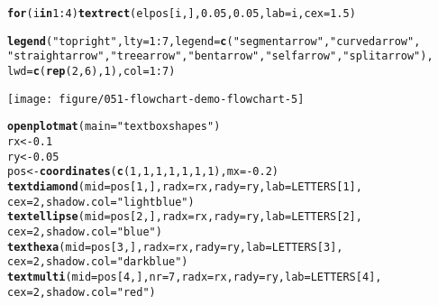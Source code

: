 \documentclass{article}\usepackage[]{graphicx}\usepackage[]{xcolor}
\makeatletter
\def\maxwidth{ %
  \ifdim\Gin@nat@width>\linewidth
    \linewidth
  \else
    \Gin@nat@width
  \fi
}
\newcommand{\hlnum}[1]{\textcolor[rgb]{0.686,0.059,0.569}{#1}}%
\newcommand{\hlsng}[1]{\textcolor[rgb]{0.192,0.494,0.8}{#1}}%
\newcommand{\hlopt}[1]{\textcolor[rgb]{0,0,0}{#1}}%
\newcommand{\hldef}[1]{\textcolor[rgb]{0.345,0.345,0.345}{#1}}%
\newcommand{\hlkwa}[1]{\textcolor[rgb]{0.161,0.373,0.58}{\textbf{#1}}}%
\newcommand{\hlkwb}[1]{\textcolor[rgb]{0.69,0.353,0.396}{#1}}%
\newcommand{\hlkwc}[1]{\textcolor[rgb]{0.333,0.667,0.333}{#1}}%
\newcommand{\hlkwd}[1]{\textcolor[rgb]{0.737,0.353,0.396}{\textbf{#1}}}%
\newenvironment{kframe}{%
 \def\at@end@of@kframe{}%
 \ifinner\ifhmode%
  \def\at@end@of@kframe{\end{minipage}}%
  \begin{minipage}{\columnwidth}%
 \fi\fi%
 \def\FrameCommand##1{\hskip\@totalleftmargin \hskip-\fboxsep
 \colorbox{shadecolor}{##1}\hskip-\fboxsep
     \hskip-\linewidth \hskip-\@totalleftmargin \hskip\columnwidth}%
 \MakeFramed {\advance\hsize-\width
   \@totalleftmargin\z@ \linewidth\hsize
   \@setminipage}}%
 {\par\unskip\endMakeFramed%
 \at@end@of@kframe}
\newenvironment{knitrout}{}{} %
\makeatother
\begin{document}
\begin{knitrout}
\begin{kframe}
\begin{alltt}
\hlkwa{for} \hldef{(i} \hlkwa{in} \hlnum{1}\hlopt{:}\hlnum{4}\hldef{)} \hlkwd{textrect}\hldef{(elpos[i, ],} \hlnum{0.05}\hldef{,} \hlnum{0.05}\hldef{,} \hlkwc{lab} \hldef{= i,} \hlkwc{cex} \hldef{=} \hlnum{1.5}\hldef{)}

\hlkwd{legend}\hldef{(}\hlsng{"topright"}\hldef{,} \hlkwc{lty} \hldef{=} \hlnum{1}\hlopt{:}\hlnum{7}\hldef{,} \hlkwc{legend} \hldef{=} \hlkwd{c}\hldef{(}\hlsng{"segmentarrow"}\hldef{,} \hlsng{"curvedarrow"}\hldef{,}
    \hlsng{"straightarrow"}\hldef{,} \hlsng{"treearrow"}\hldef{,} \hlsng{"bentarrow"}\hldef{,} \hlsng{"selfarrow"}\hldef{,} \hlsng{"splitarrow"}\hldef{),}
    \hlkwc{lwd} \hldef{=} \hlkwd{c}\hldef{(}\hlkwd{rep}\hldef{(}\hlnum{2}\hldef{,} \hlnum{6}\hldef{),} \hlnum{1}\hldef{),} \hlkwc{col} \hldef{=} \hlnum{1}\hlopt{:}\hlnum{7}\hldef{)}
\end{alltt}
\end{kframe}
\texttt{[image: figure/051-flowchart-demo-flowchart-5]} 
\begin{kframe}\begin{alltt}
\hlkwd{openplotmat}\hldef{(}\hlkwc{main} \hldef{=} \hlsng{"textbox shapes"}\hldef{)}
\hldef{rx} \hlkwb{<-} \hlnum{0.1}
\hldef{ry} \hlkwb{<-} \hlnum{0.05}
\hldef{pos} \hlkwb{<-} \hlkwd{coordinates}\hldef{(}\hlkwd{c}\hldef{(}\hlnum{1}\hldef{,} \hlnum{1}\hldef{,} \hlnum{1}\hldef{,} \hlnum{1}\hldef{,} \hlnum{1}\hldef{,} \hlnum{1}\hldef{,} \hlnum{1}\hldef{),} \hlkwc{mx} \hldef{=} \hlopt{-}\hlnum{0.2}\hldef{)}
\hlkwd{textdiamond}\hldef{(}\hlkwc{mid} \hldef{= pos[}\hlnum{1}\hldef{, ],} \hlkwc{radx} \hldef{= rx,} \hlkwc{rady} \hldef{= ry,} \hlkwc{lab} \hldef{= LETTERS[}\hlnum{1}\hldef{],}
    \hlkwc{cex} \hldef{=} \hlnum{2}\hldef{,} \hlkwc{shadow.col} \hldef{=} \hlsng{"lightblue"}\hldef{)}
\hlkwd{textellipse}\hldef{(}\hlkwc{mid} \hldef{= pos[}\hlnum{2}\hldef{, ],} \hlkwc{radx} \hldef{= rx,} \hlkwc{rady} \hldef{= ry,} \hlkwc{lab} \hldef{= LETTERS[}\hlnum{2}\hldef{],}
    \hlkwc{cex} \hldef{=} \hlnum{2}\hldef{,} \hlkwc{shadow.col} \hldef{=} \hlsng{"blue"}\hldef{)}
\hlkwd{texthexa}\hldef{(}\hlkwc{mid} \hldef{= pos[}\hlnum{3}\hldef{, ],} \hlkwc{radx} \hldef{= rx,} \hlkwc{rady} \hldef{= ry,} \hlkwc{lab} \hldef{= LETTERS[}\hlnum{3}\hldef{],}
    \hlkwc{cex} \hldef{=} \hlnum{2}\hldef{,} \hlkwc{shadow.col} \hldef{=} \hlsng{"darkblue"}\hldef{)}
\hlkwd{textmulti}\hldef{(}\hlkwc{mid} \hldef{= pos[}\hlnum{4}\hldef{, ],} \hlkwc{nr} \hldef{=} \hlnum{7}\hldef{,} \hlkwc{radx} \hldef{= rx,} \hlkwc{rady} \hldef{= ry,} \hlkwc{lab} \hldef{= LETTERS[}\hlnum{4}\hldef{],}
    \hlkwc{cex} \hldef{=} \hlnum{2}\hldef{,} \hlkwc{shadow.col} \hldef{=} \hlsng{"red"}\hldef{)}

\end{alltt}
\end{kframe}
\end{knitrout}
\end{document}
